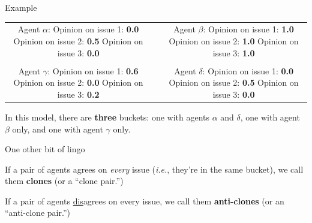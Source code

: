 \documentclass[12pt]{beamer}
\begin{document}
\begin{frame}[c]{Example} %

\begin{center}
\begin{tabular}{cp{1cm}c}
\makecell{
\color{darkgreen} \small Agent $\alpha$: \\
\color{darkgreen} \footnotesize Opinion on issue 1: \textbf{0.0} \\
\color{darkgreen} \footnotesize Opinion on issue 2: \textbf{0.5} \\
\color{darkgreen} \footnotesize Opinion on issue 3: \textbf{0.0} \\
} & &
\makecell{
\color{red} \small Agent $\beta$: \\
\color{red} \footnotesize Opinion on issue 1: \textbf{1.0} \\
\color{red} \footnotesize Opinion on issue 2: \textbf{1.0} \\
\color{red} \footnotesize Opinion on issue 3: \textbf{1.0} \\
} \\
\smallskip \\
\makecell{
\color{blue} \small Agent $\gamma$: \\
\color{blue} \footnotesize Opinion on issue 1: \textbf{0.6} \\
\color{blue} \footnotesize Opinion on issue 2: \textbf{0.0} \\
\color{blue} \footnotesize Opinion on issue 3: \textbf{0.2} \\
} & &
\makecell{
\color{darkgreen} \small Agent $\delta$: \\
\color{darkgreen} \footnotesize Opinion on issue 1: \textbf{0.0} \\
\color{darkgreen} \footnotesize Opinion on issue 2: \textbf{0.5} \\
\color{darkgreen} \footnotesize Opinion on issue 3: \textbf{0.0} \\
} \\
\end{tabular}

\bigskip
{In this model, there are \textbf{three} buckets: one with agents
$\alpha$ and $\delta$, one with agent $\beta$ only, and one with agent $\gamma$
only.}
\end{center}
\end{frame}


\begin{frame}[c]{One other bit of lingo} %

\Large
If a pair of agents agrees on \textit{every} issue (\textit{i.e.}, they're in
the same bucket), we call them \textbf{clones} (or a ``clone pair.'')

\bigskip

If a pair of agents \underline{dis}agrees on every issue, we call them
\textbf{anti-clones} (or an ``anti-clone pair.'')

\end{frame}
\end{document}
